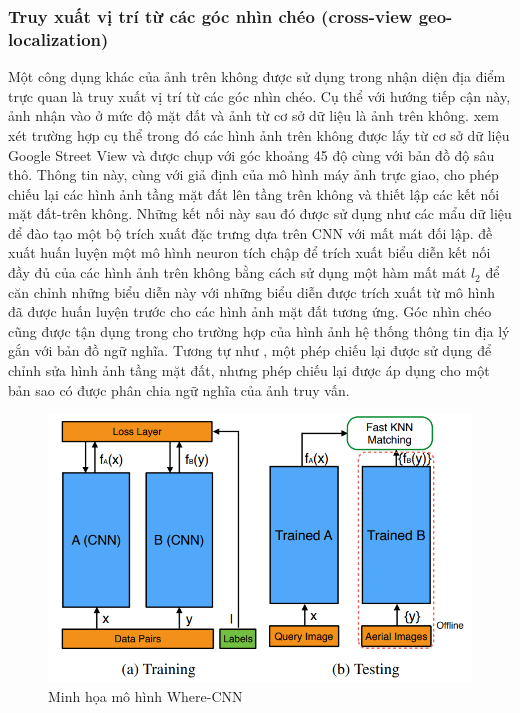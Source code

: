 \subsubsection{Truy xuất vị trí từ các góc nhìn chéo (cross-view geo-localization)}
Một công dụng khác của ảnh trên không được sử dụng trong nhận diện địa điểm trực quan là truy xuất vị trí từ các góc nhìn chéo. Cụ thể với hướng tiếp cận này, ảnh nhận vào ở mức độ mặt đất và ảnh từ cơ sở dữ liệu là ảnh trên không. \cite{Lin2015LearningDR} xem xét trường hợp cụ thể trong đó các hình ảnh trên không được lấy từ cơ sở dữ liệu Google Street View và được chụp với góc khoảng 45 độ cùng với bản đồ độ sâu thô. Thông tin này, cùng với giả định của mô hình máy ảnh trực giao, cho phép chiếu lại các hình ảnh tầng mặt đất lên tầng trên không và thiết lập các kết nối mặt đất-trên không. Những kết nối này sau đó được sử dụng như các mẩu dữ liệu để đào tạo một bộ trích xuất đặc trưng dựa trên CNN với mất mát đối lập. \cite{workman2015widearea} đề xuất huấn luyện một mô hình neuron tích chập để trích xuất biểu diễn kết nối đầy đủ của các hình ảnh trên không bằng cách sử dụng một hàm mất mát $l_2$ để căn chỉnh những biểu diễn này với những biểu diễn được trích xuất từ mô hình đã được huấn luyện trước cho các hình ảnh mặt đất tương ứng. Góc nhìn chéo cũng được tận dụng trong \cite{Castaldo2015SemanticCM} cho trường hợp của hình ảnh hệ thống thông tin địa lý gắn với bản đồ ngữ nghĩa. Tương tự như \cite{Lin2015LearningDR}, một phép chiếu lại được sử dụng để chỉnh sửa hình ảnh tầng mặt đất, nhưng phép chiếu lại được áp dụng cho một bản sao có được phân chia ngữ nghĩa của ảnh truy vấn.

\begin{figure}[H]
    \centering
    \includegraphics[width=\textwidth]{pics/Chapter2/wherecnn.png}
    \caption{Minh họa mô hình Where-CNN \cite{Lin2015LearningDR}}
\end{figure}